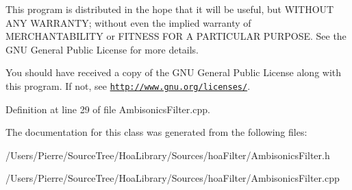 This program is distributed in the hope that it will be useful, but W\-I\-T\-H\-O\-U\-T A\-N\-Y W\-A\-R\-R\-A\-N\-T\-Y; without even the implied warranty of M\-E\-R\-C\-H\-A\-N\-T\-A\-B\-I\-L\-I\-T\-Y or F\-I\-T\-N\-E\-S\-S F\-O\-R A P\-A\-R\-T\-I\-C\-U\-L\-A\-R P\-U\-R\-P\-O\-S\-E. See the G\-N\-U General Public License for more details.

You should have received a copy of the G\-N\-U General Public License along with this program. If not, see \href{http://www.gnu.org/licenses/}{\tt http\-://www.\-gnu.\-org/licenses/}. 

Definition at line 29 of file Ambisonics\-Filter.\-cpp.



The documentation for this class was generated from the following files\-:\begin{DoxyCompactItemize}
\item 
/\-Users/\-Pierre/\-Source\-Tree/\-Hoa\-Library/\-Sources/hoa\-Filter/Ambisonics\-Filter.\-h\item 
/\-Users/\-Pierre/\-Source\-Tree/\-Hoa\-Library/\-Sources/hoa\-Filter/Ambisonics\-Filter.\-cpp\end{DoxyCompactItemize}
